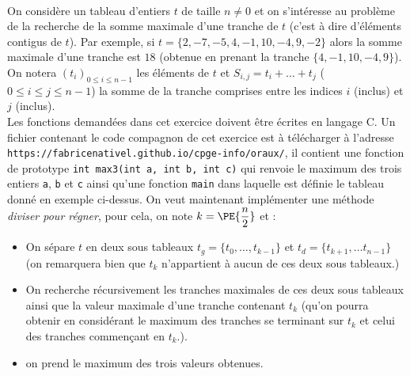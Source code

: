 \documentclass[11pt,a4paper]{article}
\begin{document}
\begin{Exercise*}[title = {type B}]\\
	On considère un tableau d'entiers $t$ de taille $n \neq  0$ et on s'intéresse au problème de la recherche de la somme maximale d'une tranche de  $t$ (c'est à dire d'éléments contigus de $t$). Par exemple, si $t = \{2, -7, -5, 4, -1, 10, -4, 9, -2\}$ alors la somme maximale d'une tranche est $18$ (obtenue en prenant la tranche $\{4, -1, 10, -4, 9\}$). On notera $(t_i)_{0  \leqslant i \leqslant n-1}$ les éléments de $t$ et $S_{i,j} = t_i+ \dots +t_j$ ($0 \leqslant i \leqslant j \leqslant n-1$) la somme de la tranche comprises entre les indices $i$ (inclus) et $j$ (inclus).\\
	Les fonctions demandées dans cet exercice doivent être écrites en langage C. Un fichier contenant le code compagnon de cet exercice est à télécharger à l'adresse {\tt https://fabricenativel.github.io/cpge-info/oraux/}, il contient une fonction de prototype \texttt{int max3(int a, int b, int c)} qui renvoie le maximum des trois entiers {\tt a}, {\tt b} et {\tt c} ainsi qu'une fonction {\tt main} dans laquelle est définie le tableau donné en exemple ci-dessus.
	\ifcorrige
	\fi
	\NRet \smallskip
	On veut maintenant implémenter une méthode \textit{diviser pour régner}, pour cela, on note $k = \PE{\dfrac{n}{2}}$ et :
	\begin{itemize}
		\item On sépare $t$ en deux sous tableaux $t_g = \{t_0, \dots, t_{k-1}\}$ et $t_d = \{ t_{k+1}, \dots t_{n-1} \}$ (on remarquera bien que $t_k$ n'appartient à aucun de ces deux sous tableaux.)
		\item On recherche récursivement les tranches maximales de ces deux sous tableaux ainsi que la valeur maximale d'une tranche contenant $t_k$ (qu'on pourra obtenir en considérant le maximum des tranches se terminant sur $t_k$ et celui des tranches commençant en $t_k$.).
		\item on prend le maximum des trois valeurs obtenues.
	\end{itemize}


\end{Exercise*}
\end{document}

